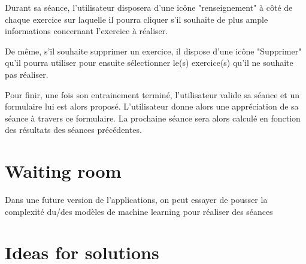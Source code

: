 Durant sa séance, l'utilisateur disposera d'une icône "renseignement" à côté de chaque exercice sur laquelle il pourra cliquer s'il souhaite de plus ample informations concernant l'exercice à réaliser.

De même, s'il souhaite supprimer un exercice, il dispose d'une icône "Supprimer" qu'il pourra utiliser pour ensuite sélectionner le(s) exercice(s) qu'il ne souhaite pas réaliser. 

Pour finir, une fois son entrainement terminé, l'utilisateur valide sa séance et un formulaire lui est alors proposé. L'utilisateur donne alors une appréciation de sa séance à travers ce formulaire. La prochaine séance sera alors calculé en fonction des résultats des séances précédentes.

\section{Waiting room}

Dans une future version de l'applications, on peut essayer de pousser la complexité du/des modèles de machine learning pour réaliser des séances 

\section{Ideas for solutions}
